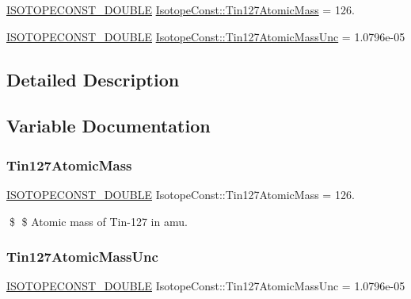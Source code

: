 \begin{DoxyCompactItemize}
\item 
\mbox{\hyperlink{group___isotope_const-_macros_ga8f45a7272ce02c0b4c65c44636ed719a}{I\+S\+O\+T\+O\+P\+E\+C\+O\+N\+S\+T\+\_\+\+D\+O\+U\+B\+LE}} \mbox{\hyperlink{group___isotope_const-_tin-_sn127_gad4497ba73c20a3e3cc2e6a7a73edacff}{Isotope\+Const\+::\+Tin127\+Atomic\+Mass}} = 126.
\item 
\mbox{\hyperlink{group___isotope_const-_macros_ga8f45a7272ce02c0b4c65c44636ed719a}{I\+S\+O\+T\+O\+P\+E\+C\+O\+N\+S\+T\+\_\+\+D\+O\+U\+B\+LE}} \mbox{\hyperlink{group___isotope_const-_tin-_sn127_ga99ca128026aca984a9195aed7b6400ec}{Isotope\+Const\+::\+Tin127\+Atomic\+Mass\+Unc}} = 1.\+0796e-\/05
\end{DoxyCompactItemize}


\subsection{Detailed Description}


\subsection{Variable Documentation}
\mbox{\label{group___isotope_const-_tin-_sn127_gad4497ba73c20a3e3cc2e6a7a73edacff}} 
\subsubsection{\texorpdfstring{Tin127\+Atomic\+Mass}{Tin127AtomicMass}}
{\footnotesize\ttfamily \mbox{\hyperlink{group___isotope_const-_macros_ga8f45a7272ce02c0b4c65c44636ed719a}{I\+S\+O\+T\+O\+P\+E\+C\+O\+N\+S\+T\+\_\+\+D\+O\+U\+B\+LE}} Isotope\+Const\+::\+Tin127\+Atomic\+Mass = 126.}

\$ \$ Atomic mass of Tin-\/127 in amu. \mbox{\label{group___isotope_const-_tin-_sn127_ga99ca128026aca984a9195aed7b6400ec}} 
\subsubsection{\texorpdfstring{Tin127\+Atomic\+Mass\+Unc}{Tin127AtomicMassUnc}}
{\footnotesize\ttfamily \mbox{\hyperlink{group___isotope_const-_macros_ga8f45a7272ce02c0b4c65c44636ed719a}{I\+S\+O\+T\+O\+P\+E\+C\+O\+N\+S\+T\+\_\+\+D\+O\+U\+B\+LE}} Isotope\+Const\+::\+Tin127\+Atomic\+Mass\+Unc = 1.\+0796e-\/05}

